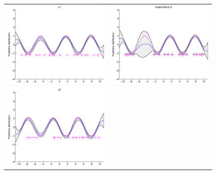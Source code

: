 \begin{figure}
\centering
\begin{tabular}{cc}
\includegraphics[scale=0.5]{figures/ssvi2-y1.eps} &
\includegraphics[scale=0.5]{figures/ssvi2-svi1.eps} \\
\includegraphics[scale=0.5]{figures/ssvi2-y2.eps} &

\end{tabular}
\end{figure}
